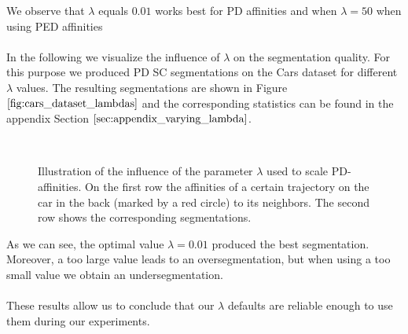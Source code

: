 We observe that $\lambda$ equals $0.01$ works best for PD affinities and when $\lambda = 50$ when using PED affinities \\ \\
In the following we visualize the influence of $\lambda$ on the segmentation quality. For this purpose we produced PD SC segmentations on the Cars dataset for different $\lambda$ values. The resulting segmentations are shown in Figure $\ref{fig:cars_dataset_lambdas}$ and the corresponding statistics can be found in the appendix Section $\ref{sec:appendix_varying_lambda}$.
\begin{figure}[H]
\begin{center}
~
\end{center}
\caption[Influence varying $\lambda$]{Illustration of the influence of the parameter $\lambda$ used to scale PD-affinities. On the first row the affinities of a certain trajectory on the car in the back (marked by a red circle) to its neighbors. The second row shows the corresponding segmentations.}
\label{fig:cars_dataset_lambdas}
\end{figure}
As we can see, the optimal value $\lambda = 0.01$ produced the best segmentation. Moreover, a too large value leads to an oversegmentation, but when using a too small value we obtain an undersegmentation. \\ \\
These results allow us to conclude that our $\lambda$ defaults are reliable enough to use them during our experiments.


